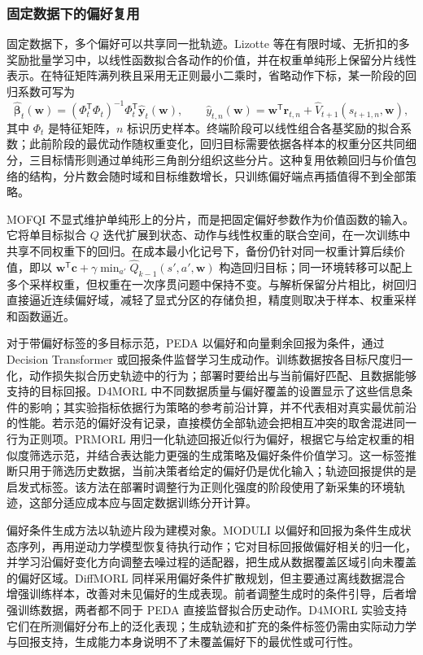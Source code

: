 \subsubsection{固定数据下的偏好复用}

固定数据下，多个偏好可以共享同一批轨迹。Lizotte 等在有限时域、无折扣的多奖励批量学习中，以线性函数拟合各动作的价值，并在权重单纯形上保留分片线性表示\cite{lizotte2012}。在特征矩阵满列秩且采用无正则最小二乘时，省略动作下标，某一阶段的回归系数可写为
\begin{equation}
\widehat{\boldsymbol\beta}_t(\mathbf w)
=(\Phi_t^{\mathsf T}\Phi_t)^{-1}\Phi_t^{\mathsf T}\widehat{\mathbf y}_t(\mathbf w),
\qquad
\widehat y_{t,n}(\mathbf w)
=\mathbf w^{\mathsf T}\mathbf r_{t,n}
+\widehat V_{t+1}(s_{t+1,n},\mathbf w),
\end{equation}
其中 $\Phi_t$ 是特征矩阵，$n$ 标识历史样本。终端阶段可以线性组合各基奖励的拟合系数；此前阶段的最优动作随权重变化，回归目标需要依据各样本的权重分区共同细分，三目标情形则通过单纯形三角剖分组织这些分片。这种复用依赖回归与价值包络的结构，分片数会随时域和目标维数增长，只训练偏好端点再插值得不到全部策略。

MOFQI 不显式维护单纯形上的分片，而是把固定偏好参数作为价值函数的输入。它将单目标拟合 $Q$ 迭代扩展到状态、动作与线性权重的联合空间，在一次训练中共享不同权重下的回归\cite{castelletti2012mofqi,castelletti2013water}。在成本最小化记号下，备份仍针对同一权重计算后续价值，即以 $\mathbf w^{\mathsf T}\mathbf c+\gamma\min_{a'}\widehat Q_{k-1}(s',a',\mathbf w)$ 构造回归目标；同一环境转移可以配上多个采样权重，但权重在一次序贯问题中保持不变。与解析保留分片相比，树回归直接逼近连续偏好域，减轻了显式分区的存储负担，精度则取决于样本、权重采样和函数逼近。

对于带偏好标签的多目标示范，PEDA 以偏好和向量剩余回报为条件，通过 Decision Transformer 或回报条件监督学习生成动作\cite{zhu2023}。训练数据按各目标尺度归一化，动作损失拟合历史轨迹中的行为；部署时要给出与当前偏好匹配、且数据能够支持的目标回报。D4MORL 中不同数据质量与偏好覆盖的设置显示了这些信息条件的影响；其实验指标依据行为策略的参考前沿计算，并不代表相对真实最优前沿的性能。若示范的偏好没有记录，直接模仿全部轨迹会把相互冲突的取舍混进同一行为正则项。PRMORL 用归一化轨迹回报近似行为偏好，根据它与给定权重的相似度筛选示范，并结合表达能力更强的生成策略及偏好条件价值学习\cite{lin2024offline}。这一标签推断只用于筛选历史数据，当前决策者给定的偏好仍是优化输入；轨迹回报提供的是启发式标签。该方法在部署时调整行为正则化强度的阶段使用了新采集的环境轨迹，这部分适应成本应与固定数据训练分开计算。

偏好条件生成方法以轨迹片段为建模对象。MODULI 以偏好和回报为条件生成状态序列，再用逆动力学模型恢复待执行动作；它对目标回报做偏好相关的归一化，并学习沿偏好变化方向调整去噪过程的适配器，把生成从数据覆盖区域引向未覆盖的偏好区域\cite{yuan2025moduli}。DiffMORL 同样采用偏好条件扩散规划，但主要通过离线数据混合增强训练样本，改善对未见偏好的生成表现\cite{xiao2025diffmorl}。前者调整生成时的条件引导，后者增强训练数据，两者都不同于 PEDA 直接监督拟合历史动作。D4MORL 实验支持它们在所测偏好分布上的泛化表现；生成轨迹和扩充的条件标签仍需由实际动力学与回报支持，生成能力本身说明不了未覆盖偏好下的最优性或可行性。

